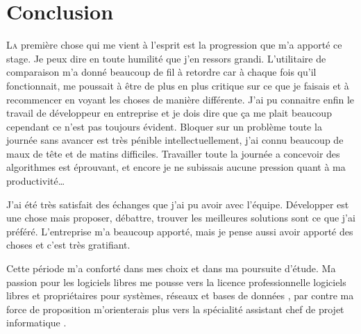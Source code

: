 \chapter{Conclusion} %
\label{cha:Conclusion}

\lettrine{L}{a} première chose qui me vient à l'esprit est la progression que
m'a apporté ce stage. Je peux dire en toute humilité que j'en ressors grandi.
L'utilitaire de comparaison m'a donné beaucoup de fil à retordre car à chaque
fois qu'il fonctionnait,  me poussait à être de plus en plus
critique sur ce que je faisais et à recommencer en voyant les choses de manière
différente.  J'ai pu connaitre enfin le travail de développeur en entreprise et
je dois dire que ça me plait beaucoup cependant ce n'est pas toujours évident.
Bloquer sur un problème toute la journée sans avancer est très pénible
intellectuellement, j'ai connu beaucoup de maux de tête et de matins
difficiles. Travailler toute la journée a concevoir des algorithmes est
éprouvant, et encore je ne subissais aucune pression quant à ma
productivité\dots

J'ai été très satisfait des échanges que j'ai pu avoir avec l'équipe.
Développer est une chose mais proposer, débattre, trouver les meilleures
solutions sont ce que j'ai préféré. L'entreprise m'a beaucoup apporté, mais je
pense aussi avoir apporté des choses et c'est très gratifiant.

Cette période m'a conforté dans mes choix et dans ma poursuite d'étude. Ma
passion pour les logiciels libres me pousse vers la licence professionnelle \og
logiciels libres et propriétaires pour systèmes, réseaux et bases de données
\fg{}, par contre ma force de proposition m'orienterais plus vers la \og
spécialité assistant chef de projet informatique \fg{}.
